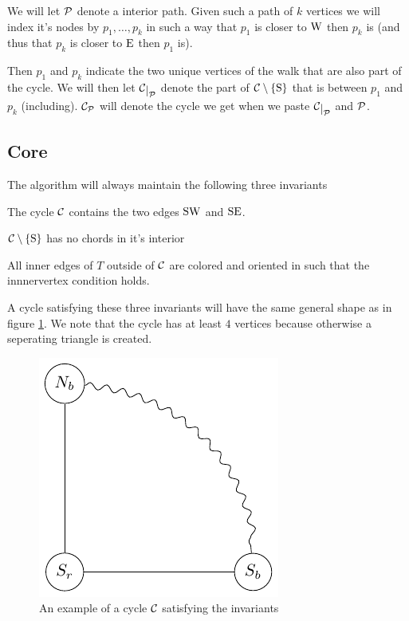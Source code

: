 We will let $\P$ denote a interior path. Given such a path of $k$ vertices we will index it's nodes by $p_1, \ldots, p_k$ in such a way that $p_1$ is closer to $\pW$ then $p_k$ is (and thus that $p_k$ is closer to $\pE$ then $p_1$ is). 

Then $p_1$ and $p_k$ indicate the two unique vertices of the walk that are also part of the cycle. We will then let $\restC{\P}$ denote the part of $\cpath$ that is between $p_1$ and $p_k$ (including). $\C_\P$ will denote the cycle we get when we paste $\restC{\P}$ and $\P$.



\subsection{Core}
\label{ss:core}

The algorithm will always maintain the following three invariants

\begin{invariants}
  \itemsep=-4pt

\item \label{i:1} The cycle $\C$ contains the two edges $\pS \pW$ and $\pS \pE$.
\item \label{i:2} $\cpath$ has no chords in it's interior 
\item \label{i:last} All inner edges of $T$ outside of $\C$ are colored and oriented in such that the innnervertex condition holds. %
\end{invariants}

A cycle satisfying these three invariants will have the same general shape as in figure \ref{fig:invCycle}. We note that the cycle has at least $4$ vertices because otherwise a seperating triangle is created. 

\begin{figure}[h!]
\centering
\includegraphics{algo/img/invCycle}

\caption{An example of a cycle $\C$ satisfying the invariants 
    \label{fig:invCycle}}
\end{figure}

